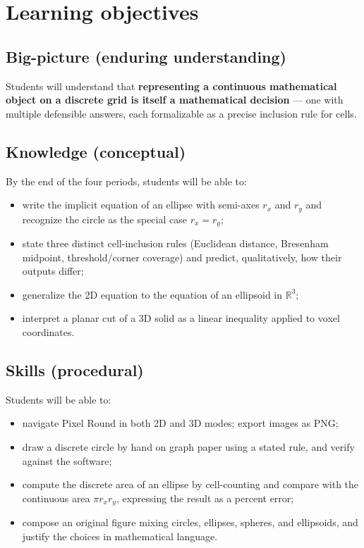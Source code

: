 \documentclass[12pt,letterpaper]{scrartcl}
\newcommand{\acc}[1]{\textcolor{accent}{\textbf{#1}}}
\begin{document}
\section{Learning objectives}

\subsection{Big-picture (enduring understanding)}

Students will understand that \acc{representing a continuous mathematical object on a discrete grid is itself a mathematical decision} --- one with multiple defensible answers, each formalizable as a precise inclusion rule for cells.

\subsection{Knowledge (conceptual)}

By the end of the four periods, students will be able to:

\begin{itemize}[leftmargin=1.3em,itemsep=0.15em,topsep=0.3em]
  \item write the implicit equation of an ellipse with semi-axes $r_x$ and $r_y$ and recognize the circle as the special case $r_x = r_y$;
  \item state three distinct cell-inclusion rules (Euclidean distance, Bresenham midpoint, threshold/corner coverage) and predict, qualitatively, how their outputs differ;
  \item generalize the 2D equation to the equation of an ellipsoid in $\mathbb{R}^3$;
  \item interpret a planar cut of a 3D solid as a linear inequality applied to voxel coordinates.
\end{itemize}

\subsection{Skills (procedural)}

Students will be able to:

\begin{itemize}[leftmargin=1.3em,itemsep=0.15em,topsep=0.3em]
  \item navigate Pixel Round in both 2D and 3D modes; export images as PNG;
  \item draw a discrete circle by hand on graph paper using a stated rule, and verify against the software;
  \item compute the discrete area of an ellipse by cell-counting and compare with the continuous area $\pi r_x r_y$, expressing the result as a percent error;
  \item compose an original figure mixing circles, ellipses, spheres, and ellipsoids, and justify the choices in mathematical language.
\end{itemize}
\end{document}
